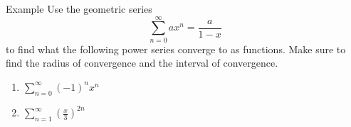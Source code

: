 \documentclass[presentation]{beamer}
\begin{document}
\begin{frame}[label={sec:org784ef9b}]{Example}
Use the geometric series
\[\sum\limits_{n=0}^{\infty} ax^n = \frac{a}{1-x}\] to find what the
following power series converge to as functions. Make sure to find the radius
of convergence and the interval of convergence.


\begin{enumerate}
\item \(\sum\limits_{n=0}^{\infty} \left( -1 \right)^n x^n\)
\item \(\sum\limits_{n=1}^{\infty} \left( \frac{x}{3} \right)^{2n}\)
\end{enumerate}

\vspace{10in}
\end{frame}
\end{document}
